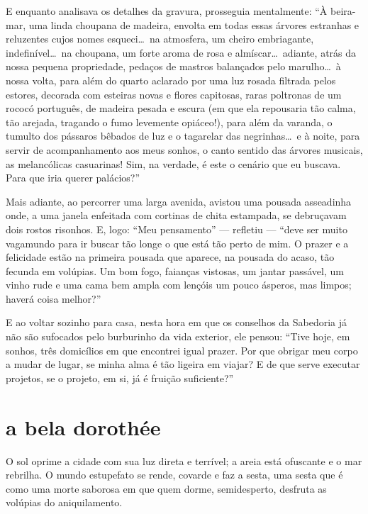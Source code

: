 E enquanto analisava os detalhes da gravura, prosseguia mentalmente:
``À beira-mar, uma linda choupana de madeira, envolta
em todas essas árvores estranhas e reluzentes cujos nomes esqueci\ldots\ 
na atmosfera, um cheiro embriagante, indefinível\ldots\  na choupana, um
forte aroma de rosa e almíscar\ldots\  adiante, atrás da nossa
pequena propriedade, pedaços de mastros balançados pelo marulho\ldots\  à nossa volta, para além do quarto aclarado por uma luz rosada filtrada
pelos estores, decorada com esteiras novas e flores capitosas, raras poltronas de um rococó português, de madeira pesada e escura (em
que ela repousaria tão calma, tão arejada, tragando o fumo
levemente opiáceo!), para além da varanda, o tumulto dos pássaros bêbados de
luz e o tagarelar das negrinhas\ldots\  e à noite, para servir de
acompanhamento aos meus sonhos, o canto sentido das árvores musicais,
as melancólicas casuarinas! Sim, na verdade, é este o cenário que eu
buscava. Para que iria querer palácios?''

Mais adiante, ao percorrer uma larga avenida, avistou uma pousada
asseadinha onde, a uma janela enfeitada com cortinas de chita
estampada, se debruçavam dois rostos risonhos. E, logo:
``Meu pensamento'' --- refletiu --- ``deve ser muito vagamundo
para ir buscar tão longe o que está tão perto de mim. O prazer e a
felicidade estão na primeira pousada que aparece, na pousada do
acaso, tão fecunda em volúpias. Um bom fogo, faianças vistosas, um
jantar passável, um vinho rude e uma cama bem ampla com lençóis um
pouco ásperos, mas limpos; haverá coisa melhor?''

E ao voltar sozinho para casa, nesta hora em que os conselhos da
Sabedoria já não são sufocados pelo burburinho da vida exterior,
ele pensou: ``Tive hoje, em sonhos, três domicílios em que
encontrei igual prazer. Por que obrigar meu corpo a mudar de lugar, se minha alma é tão ligeira em viajar? E de que serve executar projetos,
se o projeto, em si, já é fruição suficiente?''

\quebra\section[A bela Dorothée]{a bela dorothée}

O sol oprime a cidade com sua luz direta e terrível; a areia está
ofuscante e o mar rebrilha. O mundo estupefato se rende, covarde e faz
a sesta, uma sesta que é como uma morte saborosa em que quem
dorme, semidesperto, desfruta as volúpias do aniquilamento.

